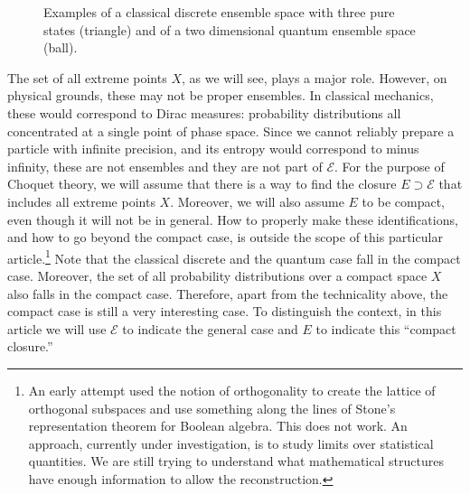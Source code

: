 \documentclass[10pt,twocolumn, nofootinbib]{revtex4-2}
\newcommand{\Ens}[1][E] {\mathcal{#1}} %
\begin{document}
\begin{figure}[H]
	\caption{Examples of a classical discrete ensemble space with three pure states (triangle) and of a two dimensional quantum ensemble space (ball).}\label{convex_examples}
\end{figure}

The set of all extreme points $X$, as we will see, plays a major role. However, on physical grounds, these may not be proper ensembles. In classical mechanics, these would correspond to Dirac measures: probability distributions all concentrated at a single point of phase space. Since we cannot reliably prepare a particle with infinite precision, and its entropy would correspond to minus infinity, these are not ensembles and they are not part of $\Ens$. For the purpose of Choquet theory, we will assume that there is a way to find the closure $E \supset \Ens$ that includes all extreme points $X$. Moreover, we will also assume $E$ to be compact, even though it will not be in general. How to properly make these identifications, and how to go beyond the compact case, is outside the scope of this particular article.\footnote{An early attempt used the notion of orthogonality to create the lattice of orthogonal subspaces and use something along the lines of Stone's representation theorem for Boolean algebra. This does not work. An approach, currently under investigation, is to study limits over statistical quantities. We are still trying to understand what mathematical structures have enough information to allow the reconstruction.} Note that the classical discrete and the quantum case fall in the compact case. Moreover, the set of all probability distributions over a compact space $X$ also falls in the compact case. Therefore, apart from the technicality above, the compact case is still a very interesting case. To distinguish the context, in this article we will use $\Ens$ to indicate the general case and $E$ to indicate this ``compact closure.''
\end{document}
